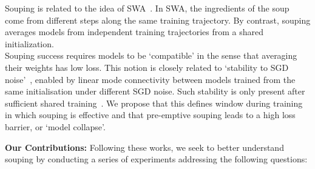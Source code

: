 Souping is related to the idea of SWA~\cite{stochasticweightaveraging}. In SWA, the ingredients of the soup come from different steps along the same training trajectory. By contrast, souping averages models from independent training trajectories from a shared initialization. \\

Souping success requires models to be `compatible' in the sense that averaging their weights has low loss. This notion is closely related to `stability to SGD noise'~\citet{linearmode}, enabled by linear mode connectivity between models trained from the same initialisation under different SGD noise. Such stability is only present after sufficient shared training~\citet{transientperformancegains}. We propose that this defines window during training in which souping is effective and that pre-emptive souping leads to a high loss barrier, or `model collapse'.



\textbf{Our Contributions:} Following these works, we seek to better understand souping by conducting a series of experiments addressing the following questions:

